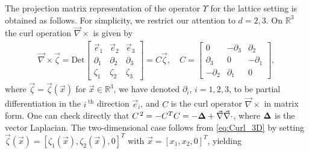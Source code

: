 \documentclass{cmslatex}
\newcommand\bDelta{\mbox{\boldmath${\Delta}$}}
\begin{document}
The projection matrix representation of the operator $\Upsilon$ for the
lattice setting is obtained as follows. For simplicity, we restrict
our attention to $d=2,3$. On $\mathbb{R}^3$ the curl 
operation $\vec{\nabla}\times$ is given by 
%
\begin{align}\label{eq:Curl_3D}
  \vec{\nabla}\times\vec{\zeta}=
     \text{Det}\left[
  \begin{array}{ccc}
    \vec{e}_1 &\vec{e}_2 &\vec{e}_3\\
       \partial_1    &   \partial_2    &   \partial_3   \\
       \zeta_1    &   \zeta_2    &   \zeta_3   
    \end{array}
    \right]
    =C\vec{\zeta}, \quad
    C=
    \left[
    \begin{array}{ccc}
       0  & -\partial_3  &   \partial_2 \\
       \partial_3 &  0   &  -\partial_1 \\
      -\partial_2 &  \partial_1  &   0
    \end{array}
    \right],    
\end{align}
%
where $\vec{\zeta}=\vec{\zeta}(\vec{x})$ for $\vec{x}\in\mathbb{R}^3$, we
have denoted $\partial_i$, $i=1,2,3$, to be partial differentiation in the
$i^{\;\text{th}}$ direction $\vec{e}_i$, and $C$ is the curl
operator $\vec{\nabla}\times$ in matrix form. One can check directly
that $C^{\,2}=-C^TC=-\bDelta+\vec{\nabla}\vec{\nabla}\cdot$, where $\bDelta$ is the vector
Laplacian.
The two-dimensional case 
follows from \eqref{eq:Curl_3D} by setting
$\vec{\zeta}(\vec{x})=[\zeta_1(\vec{x}),\zeta_2(\vec{x}),0]^T$ with
$\vec{x}=[x_1,x_2,0]^T$, yielding   
%
\end{document}
